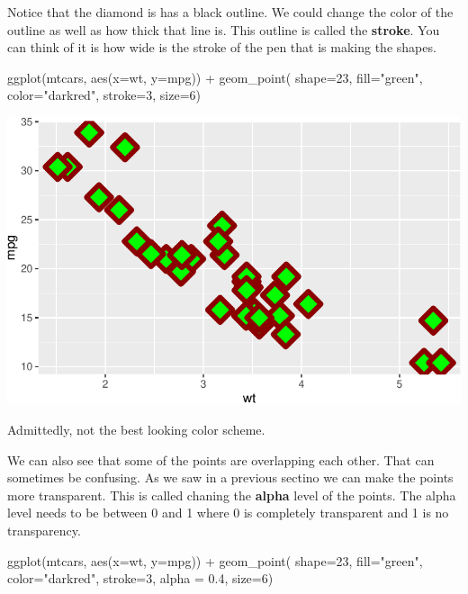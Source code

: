 \documentclass[
  letterpaper,
  DIV=11,
  numbers=noendperiod]{scrreprt}
\newenvironment{Shaded}{\begin{snugshade}}{\end{snugshade}}
\newcommand{\AttributeTok}[1]{\textcolor[rgb]{0.40,0.45,0.13}{#1}}
\newcommand{\DecValTok}[1]{\textcolor[rgb]{0.68,0.00,0.00}{#1}}
\newcommand{\FloatTok}[1]{\textcolor[rgb]{0.68,0.00,0.00}{#1}}
\newcommand{\FunctionTok}[1]{\textcolor[rgb]{0.28,0.35,0.67}{#1}}
\newcommand{\NormalTok}[1]{\textcolor[rgb]{0.00,0.23,0.31}{#1}}
\newcommand{\SpecialCharTok}[1]{\textcolor[rgb]{0.37,0.37,0.37}{#1}}
\newcommand{\StringTok}[1]{\textcolor[rgb]{0.13,0.47,0.30}{#1}}
\begin{document}
Notice that the diamond is has a black outline. We could change the
color of the outline as well as how thick that line is. This outline is
called the \textbf{stroke}. You can think of it is how wide is the
stroke of the pen that is making the shapes.

\begin{Shaded}
\begin{Highlighting}[]
\FunctionTok{ggplot}\NormalTok{(mtcars, }\FunctionTok{aes}\NormalTok{(}\AttributeTok{x=}\NormalTok{wt, }\AttributeTok{y=}\NormalTok{mpg)) }\SpecialCharTok{+}
  \FunctionTok{geom\_point}\NormalTok{( }\AttributeTok{shape=}\DecValTok{23}\NormalTok{, }\AttributeTok{fill=}\StringTok{"green"}\NormalTok{, }\AttributeTok{color=}\StringTok{"darkred"}\NormalTok{, }\AttributeTok{stroke=}\DecValTok{3}\NormalTok{, }\AttributeTok{size=}\DecValTok{6}\NormalTok{)}
\end{Highlighting}
\end{Shaded}

\includegraphics{Advanced_Scatterplot_Techniques_files/figure-pdf/unnamed-chunk-7-1.pdf}

Admittedly, not the best looking color scheme.

We can also see that some of the points are overlapping each other. That
can sometimes be confusing. As we saw in a previous sectino we can make
the points more transparent. This is called chaning the \textbf{alpha}
level of the points. The alpha level needs to be between 0 and 1 where 0
is completely transparent and 1 is no transparency.

\begin{Shaded}
\begin{Highlighting}[]
\FunctionTok{ggplot}\NormalTok{(mtcars, }\FunctionTok{aes}\NormalTok{(}\AttributeTok{x=}\NormalTok{wt, }\AttributeTok{y=}\NormalTok{mpg)) }\SpecialCharTok{+}
  \FunctionTok{geom\_point}\NormalTok{( }\AttributeTok{shape=}\DecValTok{23}\NormalTok{, }\AttributeTok{fill=}\StringTok{"green"}\NormalTok{, }\AttributeTok{color=}\StringTok{"darkred"}\NormalTok{, }\AttributeTok{stroke=}\DecValTok{3}\NormalTok{, }
              \AttributeTok{alpha =} \FloatTok{0.4}\NormalTok{, }\AttributeTok{size=}\DecValTok{6}\NormalTok{)}
\end{Highlighting}
\end{Shaded}
\end{document}
